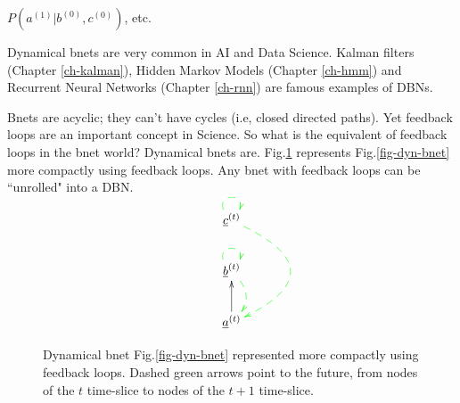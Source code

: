 $P(a^{(1)}|b^{(0)}, c^{(0)})$, etc.

Dynamical bnets
are very common
in AI and Data Science.
Kalman filters (Chapter \ref{ch-kalman}),
Hidden Markov Models (Chapter \ref{ch-hmm})
and
Recurrent Neural Networks 
(Chapter \ref{ch-rnn})
are famous examples of DBNs.

Bnets are acyclic; they can't have cycles
(i.e, closed directed paths).
Yet feedback loops are an important
concept in Science. So what is
the equivalent of feedback loops in the
bnet world? Dynamical bnets are.
Fig.\ref{fig-dyn-bnet-compact}
represents
Fig.\ref{fig-dyn-bnet} more 
compactly using feedback loops. 
Any bnet with feedback loops
can be ``unrolled" into a DBN.


\begin{figure}[h!]
$$
\xymatrix{
\rvc^{(t)}
\ar@/^4pc/@[green]@{-->}[dd]
\ar@(ul,ur)@[green]@{-->}[]
\\
\rvb^{(t)}
\ar@/^1pc/@[green]@{-->}[d]
\ar@(ul,ur)@[green]@{-->}[]
\\
\rva^{(t)}\ar[u]
}$$
\caption{
Dynamical bnet Fig.\ref{fig-dyn-bnet}
represented 
more compactly using feedback loops.
Dashed green arrows
point to the future, from nodes of the $t$ time-slice
to nodes of the $t+1$ time-slice.
}
\label{fig-dyn-bnet-compact}
\end{figure}

